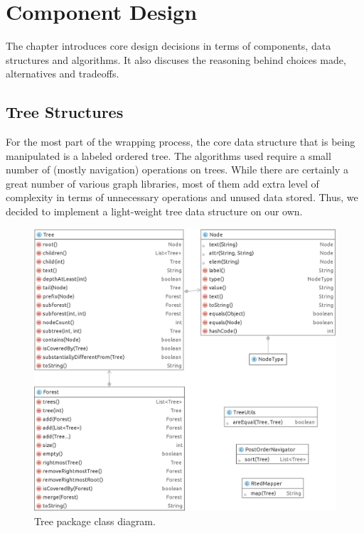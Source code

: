 \chapter{Component Design}
\label{ch:implementation}


The chapter introduces core design decisions in terms of components, data structures and algorithms. It also discuses the reasoning behind choices made, alternatives and tradeoffs.


\section{Tree Structures}

For the most part of the wrapping process, the core data structure that is being manipulated is a labeled ordered tree. The algorithms used require a small number of (mostly navigation) operations on trees. While there are certainly a great number of various graph libraries, most of them add extra level of complexity in terms of unnecessary operations and unused data stored. Thus, we decided to implement a light-weight tree data structure on our own.

\begin{figure}[h]
	\centering
	\includegraphics[width=1.0\textwidth]{figures/package-tree}
	\caption{Tree package class diagram.}
	\label{fig:package-tree}
\end{figure}

